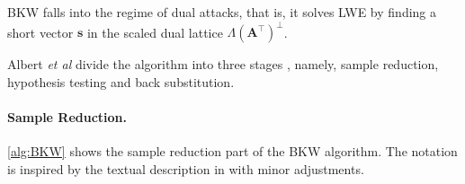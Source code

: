 BKW falls into the regime of dual attacks, that is, it solves LWE by finding a short vector $\mathbf{s}$ in the scaled dual lattice $\Lambda(\mathbf{A}^\intercal)^{\perp}$.


Albert \textit{et al} divide the algorithm into three stages \cite{ACFFP15a}, namely, sample reduction, hypothesis testing and back substitution.

\paragraph{Sample Reduction.} \cref{alg:BKW} shows the sample reduction part of the BKW algorithm. The notation is inspired by the textual description in \cite{GJS15} with minor adjustments.



